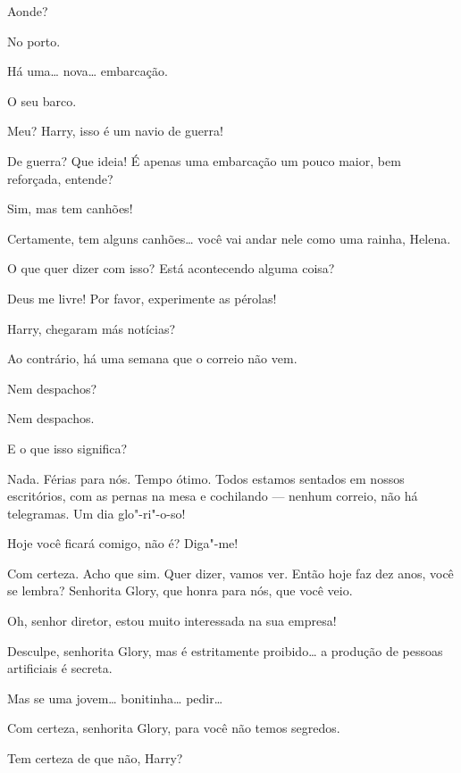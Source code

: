  Aonde?

 No porto.

 Há uma\ldots{} nova\ldots{} embarcação.

 O seu barco.

 Meu? Harry, isso é um navio de guerra!

 De guerra? Que ideia! É apenas uma embarcação um pouco maior, bem reforçada, entende?

 Sim, mas tem canhões!

 Certamente, tem alguns canhões\ldots{} você vai andar nele como uma rainha,
Helena.

 O que quer dizer com isso? Está acontecendo alguma coisa?

 Deus me livre! Por favor, experimente as pérolas! 

 Harry, chegaram más notícias?

 Ao contrário, há uma semana que o correio não vem.

 Nem despachos?

 Nem despachos.

 E o que isso significa?

 Nada. Férias para nós. Tempo ótimo. Todos estamos sentados em nossos
escritórios, com as pernas na mesa e cochilando --- nenhum correio, não há
telegramas.  Um dia glo"-ri"-o-so!

  Hoje você ficará comigo, não é? Diga"-me!

 Com certeza. Acho que sim. Quer dizer, vamos ver.  Então hoje faz dez anos, você se lembra? Senhorita Glory, que honra
para nós, que você veio.

 Oh, senhor diretor, estou muito interessada na sua empresa!

 Desculpe, senhorita Glory, mas é estritamente proibido\ldots{} a produção
de pessoas artificiais é secreta.

 Mas se uma jovem\ldots{} bonitinha\ldots{} pedir\ldots{}

 Com certeza, senhorita Glory, para você não temos segredos.

  Tem certeza de que não, Harry?


